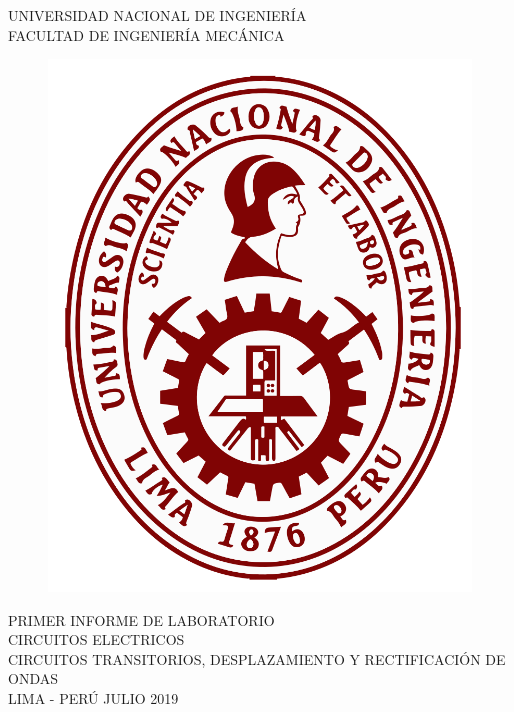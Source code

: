\documentclass[a4paper,12pt]{report}
\begin{document}
\setcounter{page}{1}
\thispagestyle{empty}
\begin{center}
{\huge UNIVERSIDAD NACIONAL DE INGENIERÍA}\\[0.9cm]
{\Large FACULTAD DE INGENIERÍA MECÁNICA}\\[0.6in]
\end{center}
\begin{figure}[h]
\begin{center}
\includegraphics[scale=0.33]{logoUNI.png}
\end{center}
\end{figure}
\vspace{0.4cm}
\begin{center}
PRIMER INFORME DE LABORATORIO\\
CIRCUITOS ELECTRICOS\\[14mm]
{\Large CIRCUITOS TRANSITORIOS, DESPLAZAMIENTO Y RECTIFICACIÓN DE ONDAS}\\[10mm]
\vfill
LIMA - PERÚ \hfill JULIO 2019
\end{center}
\end{document}
